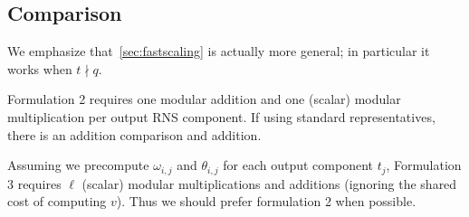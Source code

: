 \subsection{Comparison}
We emphasize that~\cref{sec:fastscaling} is actually more general; in particular it works when $t \nmid q$.

Formulation 2 requires one modular addition and one (scalar) modular multiplication per output RNS component. If using standard representatives, there is an addition comparison and addition.

Assuming we precompute $\omega_{i,j}$ and $\theta_{i,j}$ for each output component $t_j$, Formulation 3 requires $\ell$ (scalar) modular multiplications and additions (ignoring the shared cost of computing $v$). Thus we should prefer formulation 2 when possible.